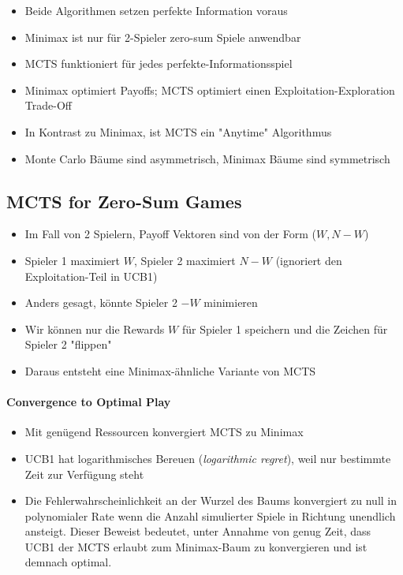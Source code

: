 \documentclass[a4paper]{article}
\begin{document}
		\begin{itemize}
			\item Beide Algorithmen setzen perfekte Information voraus
			\item Minimax ist nur für 2-Spieler zero-sum Spiele anwendbar
			\item MCTS funktioniert für jedes perfekte-Informationsspiel
			\item Minimax optimiert Payoffs; MCTS optimiert einen Exploitation-Exploration Trade-Off
			\item In Kontrast zu Minimax, ist MCTS ein "Anytime" Algorithmus
			\item Monte Carlo Bäume sind asymmetrisch, Minimax Bäume sind symmetrisch
		\end{itemize}
	
		\subsection{MCTS for Zero-Sum Games}
		
		\begin{itemize}
			\item Im Fall von 2 Spielern, Payoff Vektoren sind von der Form ($W, N-W$)
			\item Spieler 1 maximiert $W$, Spieler 2 maximiert $N-W$ (ignoriert den Exploitation-Teil in UCB1)
			\item Anders gesagt, könnte Spieler 2 $-W$ minimieren
			\item Wir können nur die Rewards $W$ für Spieler 1 speichern und die Zeichen für Spieler 2 "flippen"
			\item Daraus entsteht eine Minimax-ähnliche Variante von MCTS
		\end{itemize}
	
		\paragraph{Convergence to Optimal Play}
		
		\begin{itemize}
			\item Mit genügend Ressourcen konvergiert MCTS zu Minimax
			\item UCB1 hat logarithmisches Bereuen (\textit{logarithmic regret}), weil nur bestimmte Zeit zur Verfügung steht
			\item Die Fehlerwahrscheinlichkeit an der Wurzel des Baums konvergiert zu null in polynomialer Rate wenn die Anzahl simulierter Spiele in Richtung unendlich ansteigt.
			Dieser Beweist bedeutet, unter Annahme von genug Zeit, dass UCB1 der MCTS erlaubt zum Minimax-Baum zu konvergieren und ist demnach optimal.
		\end{itemize}
		
\end{document}
